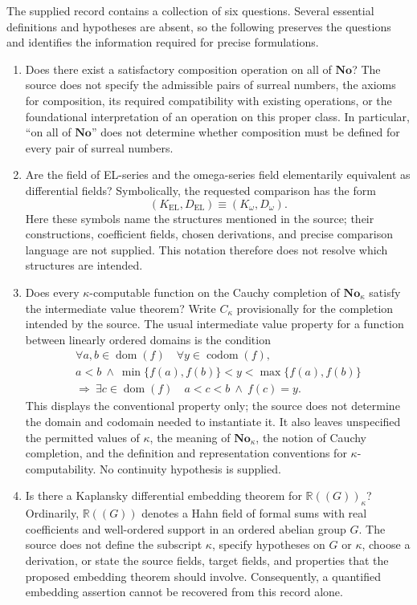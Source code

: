 \documentclass[11pt]{article}
\begin{document}
The supplied record contains a collection of six questions. Several essential definitions and hypotheses are absent, so the following preserves the questions and identifies the information required for precise formulations.
\begin{enumerate}
\item Does there exist a satisfactory composition operation on all of \(\mathbf{No}\)? The source does not specify the admissible pairs of surreal numbers, the axioms for composition, its required compatibility with existing operations, or the foundational interpretation of an operation on this proper class. In particular, ``on all of \(\mathbf{No}\)'' does not determine whether composition must be defined for every pair of surreal numbers.

\item Are the field of EL-series and the omega-series field elementarily equivalent as differential fields? Symbolically, the requested comparison has the form
\[
(K_{\mathrm{EL}},D_{\mathrm{EL}})\equiv(K_{\omega},D_{\omega}).
\]
Here these symbols name the structures mentioned in the source; their constructions, coefficient fields, chosen derivations, and precise comparison language are not supplied. This notation therefore does not resolve which structures are intended.

\item Does every \(\kappa\)-computable function on the Cauchy completion of \(\mathbf{No}_{\kappa}\) satisfy the intermediate value theorem? Write \(C_{\kappa}\) provisionally for the completion intended by the source. The usual intermediate value property for a function between linearly ordered domains is the condition
\[
\begin{gathered}
\forall a,b\in\operatorname{dom}(f)\quad\forall y\in\operatorname{codom}(f),\\
a<b\ \land\ \min\{f(a),f(b)\}<y<\max\{f(a),f(b)\}\\
\Longrightarrow\ \exists c\in\operatorname{dom}(f)\quad
 a<c<b\ \land\ f(c)=y.
\end{gathered}
\]
This displays the conventional property only; the source does not determine the domain and codomain needed to instantiate it. It also leaves unspecified the permitted values of \(\kappa\), the meaning of \(\mathbf{No}_{\kappa}\), the notion of Cauchy completion, and the definition and representation conventions for \(\kappa\)-computability. No continuity hypothesis is supplied.

\item Is there a Kaplansky differential embedding theorem for \(\mathbb{R}((G))_{\kappa}\)? Ordinarily, \(\mathbb{R}((G))\) denotes a Hahn field of formal sums with real coefficients and well-ordered support in an ordered abelian group \(G\). The source does not define the subscript \(\kappa\), specify hypotheses on \(G\) or \(\kappa\), choose a derivation, or state the source fields, target fields, and properties that the proposed embedding theorem should involve. Consequently, a quantified embedding assertion cannot be recovered from this record alone.


\end{enumerate}
\end{document}
